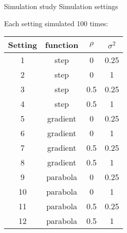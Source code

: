 \documentclass[12pt,t]{beamer}
\newcommand{\subt}[1]{{\footnotesize \color{subtitle} {#1}}}
\begin{document}
\begin{frame}{Simulation study}
\subt{Simulation settings}

Each setting simulated 100 times:
    \begin{table}[h!]
        \begin{center}
        \begin{tabular}{cccc}
            \hline
            Setting & function & $\rho$ & $\sigma^2$ \\ 
            \hline
            1 & step & 0 & 0.25 \\ 
            2 & step & 0 & 1 \\ 
            3 & step & 0.5 & 0.25 \\ 
            4 & step & 0.5 & 1 \\ 
            \hline
            5 & gradient & 0 & 0.25 \\ 
            6 & gradient & 0 & 1 \\ 
            7 & gradient & 0.5 & 0.25 \\ 
            8 & gradient & 0.5 & 1 \\ 
            \hline
            9 & parabola & 0 & 0.25 \\ 
            10 & parabola & 0 & 1 \\ 
            11 & parabola & 0.5 & 0.25 \\ 
            12 & parabola & 0.5 & 1 
        \end{tabular}
        \end{center}
    \end{table}
\end{frame}
\end{document}
